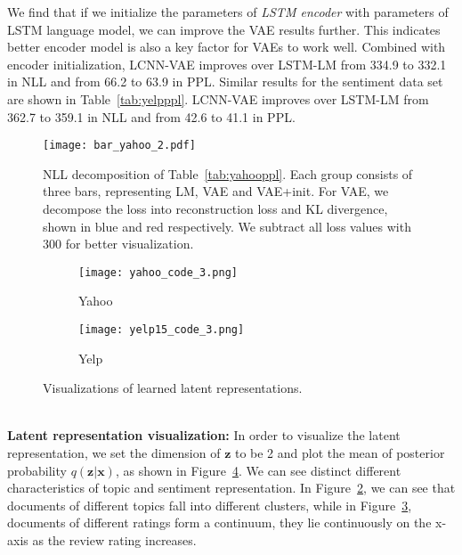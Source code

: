 \documentclass{article}
\begin{document}
We find that if we initialize the parameters of {\em LSTM encoder} with
parameters of LSTM language model, we can improve the VAE results further.
This indicates better encoder model is also a key factor for VAEs
to work well. Combined with encoder initialization, LCNN-VAE improves over LSTM-LM from
334.9 to 332.1 in NLL and from 66.2 to 63.9 in PPL. Similar results for the sentiment data set are shown in Table~\ref{tab:yelpppl}. LCNN-VAE improves over LSTM-LM from 362.7
to 359.1 in NLL and from 42.6 to 41.1 in PPL.
\begin{figure}[!tb]
  \centering
  \texttt{[image: bar\_yahoo\_2.pdf]}
  \caption{NLL decomposition of Table~\ref{tab:yahooppl}. Each group consists
    of three bars, representing LM, VAE and VAE+init. For VAE, we decompose the
    loss into reconstruction loss and KL divergence, shown in blue and red
    respectively. We subtract all loss values with $300$ for better
    visualization.}
  \label{fig:kl}
\end{figure}
\begin{figure}[!tb]
  \centering
  \begin{subfigure}{0.23\textwidth}
    \centering
    \texttt{[image: yahoo\_code\_3.png]}
    \caption{Yahoo}
    \label{fig:yahoo_code}
  \end{subfigure}
  \begin{subfigure}{0.23\textwidth}
    \centering
    \texttt{[image: yelp15\_code\_3.png]}
    \caption{Yelp}
    \label{fig:yelp_code}
  \end{subfigure}
  \caption{Visualizations of learned latent representations.}
  \label{fig:code}
\end{figure}
\\[0.2cm]
{\bf Latent representation visualization:} In order to visualize the latent representation,
we set the dimension of $\mathbf{z}$ to be 2
and plot the mean of posterior probability $q(\mathbf{z}|\mathbf{x})$, as shown in
Figure~\ref{fig:code}. We can see distinct different characteristics of topic
and sentiment representation. In Figure~\ref{fig:yahoo_code}, we can see that documents
of different topics fall into different clusters, while in
Figure~\ref{fig:yelp_code}, documents of different ratings
form a continuum, they lie continuously on the x-axis as the review rating increases.
\end{document}

